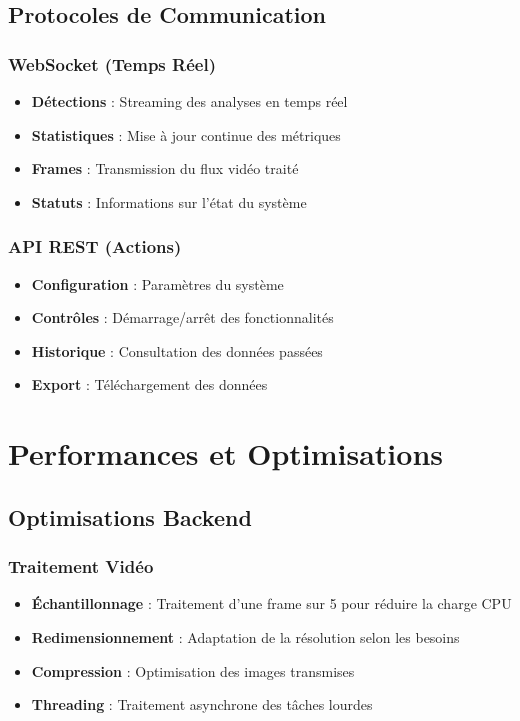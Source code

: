 \documentclass[12pt,a4paper]{article}
\begin{document}
\subsection{Protocoles de Communication}

\subsubsection{WebSocket (Temps Réel)}
\begin{itemize}
    \item \textbf{Détections} : Streaming des analyses en temps réel
    \item \textbf{Statistiques} : Mise à jour continue des métriques
    \item \textbf{Frames} : Transmission du flux vidéo traité
    \item \textbf{Statuts} : Informations sur l'état du système
\end{itemize}

\subsubsection{API REST (Actions)}
\begin{itemize}
    \item \textbf{Configuration} : Paramètres du système
    \item \textbf{Contrôles} : Démarrage/arrêt des fonctionnalités
    \item \textbf{Historique} : Consultation des données passées
    \item \textbf{Export} : Téléchargement des données
\end{itemize}

\section{Performances et Optimisations}

\subsection{Optimisations Backend}

\subsubsection{Traitement Vidéo}
\begin{itemize}
    \item \textbf{Échantillonnage} : Traitement d'une frame sur 5 pour réduire la charge CPU
    \item \textbf{Redimensionnement} : Adaptation de la résolution selon les besoins
    \item \textbf{Compression} : Optimisation des images transmises
    \item \textbf{Threading} : Traitement asynchrone des tâches lourdes
\end{itemize}
\end{document}

